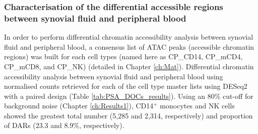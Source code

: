 


\subsubsection{Characterisation of the differential accessible regions between synovial fluid and peripheral blood}

In order to perform differential chromatin accessibility analysis between synovial fluid and peripheral blood, a consensus list of ATAC peaks (accessible chromatin regions) was built for each cell types (named here as CP\_CD14, CP\_mCD4, CP\_mCD8, and CP\_NK) (detailed in Chapter \ref{ch:Mat}). %
 Differential chromatin accessibility analysis between synovial fluid and peripheral blood using normalised counts retrieved for each of the cell type master lists using DESeq2 with a paired design (Table \ref{tab:PSA_DOCs_results}). Using an 80\% cut-off for background noise (Chapter \ref{ch:Results1}), %
CD14$^+$ monocytes and NK cells showed the greatest total number (5,285 and 2,314, respectively) and proportion of DARs (23.3 and 8.9\%, respectively). 


